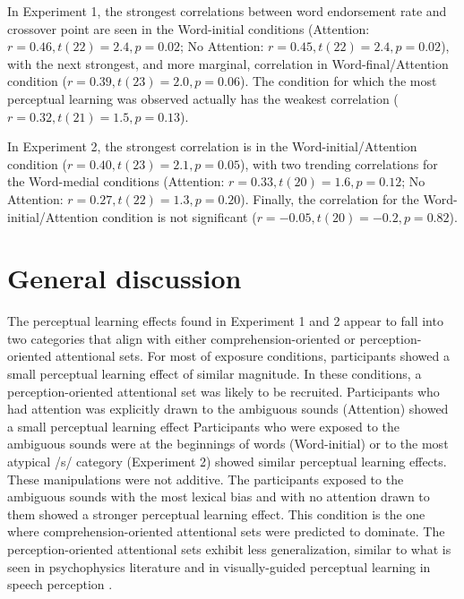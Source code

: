 In Experiment 1, the strongest correlations between word endorsement rate and crossover point are seen in the Word-initial conditions (Attention: $r = 0.46, t(22) = 2.4, p = 0.02$; No Attention: $r = 0.45, t(22) = 2.4, p = 0.02$), with the next strongest, and more marginal, correlation in Word-final/Attention condition ($r = 0.39, t(23) = 2.0, p = 0.06$).  The condition for which the most perceptual learning was observed actually has the weakest correlation ($r = 0.32, t(21) = 1.5, p = 0.13$).

In Experiment 2, the strongest correlation is in the Word-initial/Attention condition ($r = 0.40, t(23) = 2.1, p = 0.05$), with two trending correlations for the Word-medial conditions (Attention: $r = 0.33, t(20) = 1.6, p = 0.12$; No Attention: $r = 0.27, t(22) = 1.3, p = 0.20$).  Finally, the correlation for the Word-initial/Attention condition is not significant ($r = -0.05, t(20) = -0.2, p = 0.82$).

\section{General discussion}

The perceptual learning effects found in Experiment 1 and 2 appear to fall into two categories that align with either comprehension-oriented or perception-oriented attentional sets.  
For most of exposure conditions, participants showed a small perceptual learning effect of similar magnitude.
In these conditions, a perception-oriented attentional set was likely to be recruited.
Participants who had attention was explicitly drawn to the ambiguous sounds (Attention) showed a small perceptual learning effect
Participants who were exposed to the ambiguous sounds were at the beginnings of words (Word-initial) or to the most atypical /s/ category (Experiment 2) showed similar perceptual learning effects.
These manipulations were not additive.
The participants exposed to the ambiguous sounds with the most lexical bias and with no attention drawn to them showed a stronger perceptual learning effect.
This condition is the one where comprehension-oriented attentional sets were predicted to dominate.
The perception-oriented attentional sets exhibit less generalization, similar to what is seen in psychophysics literature and  in visually-guided perceptual learning in speech perception \citep{Reinisch2014}.

